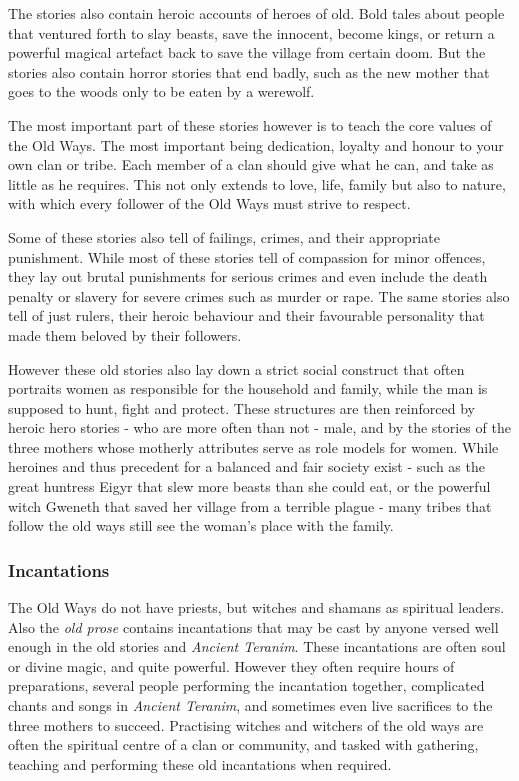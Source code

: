 The stories also contain heroic accounts of heroes of old. Bold tales about
people that ventured forth to slay beasts, save the innocent, become kings, or
return a powerful magical artefact back to save the village from certain doom.
But the stories also contain horror stories that end badly, such as the new
mother that goes to the woods only to be eaten by a werewolf.

The most important part of these stories however is to teach the core values of
the Old Ways. The most important being dedication, loyalty and honour to your
own clan or tribe. Each member of a clan should give what he can, and take as
little as he requires. This not only extends to love, life, family but also
to nature, with which every follower of the Old Ways must strive to respect.

Some of these stories also tell of failings, crimes, and their appropriate
punishment. While most of these stories tell of compassion for minor offences,
they lay out brutal punishments for serious crimes and even include the death
penalty or slavery for severe crimes such as murder or rape. The same stories
also tell of just rulers, their heroic behaviour and their favourable
personality that made them beloved by their followers.

However these old stories also lay down a strict social construct that often
portraits women as responsible for the household and family, while the man is
supposed to hunt, fight and protect. These structures are then reinforced by
heroic hero stories - who are more often than not - male, and by the stories
of the three mothers whose motherly attributes serve as role models for women.
While heroines and thus precedent for a balanced and fair society exist - such
as the great huntress Eigyr that slew more beasts than she could eat, or the
powerful witch Gweneth that saved her village from a terrible plague - many
tribes that follow the old ways still see the woman's place with the family.

\subsubsection{Incantations}

The Old Ways do not have priests, but witches and shamans as spiritual
leaders. Also the \emph{old prose} contains incantations that may be cast by
anyone versed well enough in the old stories and \emph{Ancient Teranim}. These
incantations are often soul or divine magic, and quite powerful. However they
often require hours of preparations, several people performing the incantation
together, complicated chants and songs in \emph{Ancient Teranim}, and
sometimes even live sacrifices to the three mothers to succeed. Practising
witches and witchers of the old ways are often the spiritual centre of a clan
or community, and tasked with gathering, teaching and performing these old
incantations when required.
